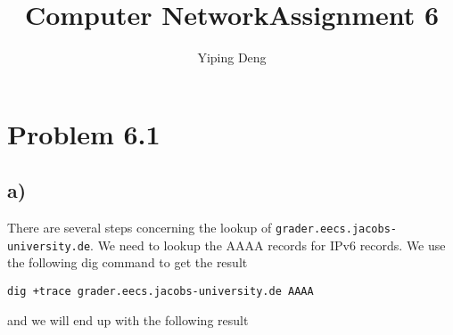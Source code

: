 \documentclass{article}
\newcommand{\coursename}{Computer Network}
\newcommand{\hwnumber}{6}
\begin{document}
\title{\coursename \thinspace Assignment \hwnumber}
\author{Yiping Deng}
\maketitle
\thispagestyle{fancy}

\section*{Problem 6.1}
\subsection*{a)}
There are several steps concerning the lookup of
\verb+grader.eecs.jacobs-university.de+.
We need to lookup the AAAA records for IPv6 records.
We use the following dig command to get the result
\begin{verbatim}
dig +trace grader.eecs.jacobs-university.de AAAA
\end{verbatim}
and we will end up with the following result
\end{document}
